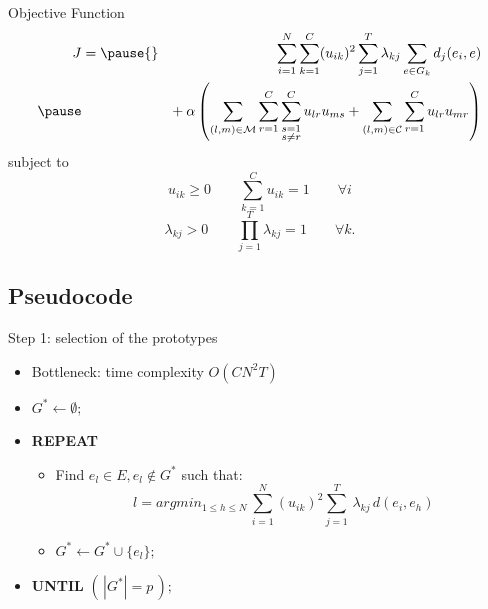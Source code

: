 \documentclass{beamer}
\begin{document}
\begin{frame}{Objective Function}
\begin{eqnarray*}
  J&{}=
  \pause
  {}&\sum_{i=1}^{N}\sum_{k=1}^{C}(u_{ik})^{2}\sum_{j=1}^{T}\lambda_{kj}\sum_{e \in G_{k}}d_{j}(e_{i},e)\\
  \pause
  &&{+}\:\alpha\left (\sum_{(l,m)\in\mathcal{M}}\sum_{r=1}^{C}\sum_{\substack{s=1 \\{s}\neq{r}}}^{C}u_{lr}u_{ms}+\sum_{(l,m)\in\mathcal{C}}\sum_{r=1}^{C}u_{lr}u_{mr}\right )
\end{eqnarray*}
  \pause
subject to
\begin{displaymath}
  u_{ik} \geq 0\qquad\sum_{k=1}^{C}u_{ik} = 1\qquad\forall i
\end{displaymath}
\begin{displaymath}
  \lambda_{kj} > 0\qquad\prod_{j=1}^{T}\lambda_{kj} = 1\qquad\forall k.
\end{displaymath}
\end{frame}

\subsection{Pseudocode}

%

\begin{frame}{Step 1: selection of the prototypes}
	\begin{itemize}
		\item{Bottleneck: time complexity $O({C}{N^2}{T})$}
	\end{itemize}
	\begin{itemize}
		\item[]$G^{*} \leftarrow \emptyset;$ 
		\item[]\textbf{REPEAT}
			\begin{itemize}
				\item[]Find $e_l \in E, e_l \not\in G^{*}$ such that:
					\begin{displaymath}
							l = argmin_{1 \leq h \leq N} \, \displaystyle \sum_{i=1}^N (u_{ik})^{2} \sum_{j=1}^T \, \lambda_{kj} \, d(e_i,e_h)
					\end{displaymath}
				\item[]$G^{*} \leftarrow  G^{*} \cup \{e_l\};$
			\end{itemize}
		\item[]\textbf{UNTIL} $(\,|G^{*}| = p\,);$
	\end{itemize}
\end{frame}
\end{document}
